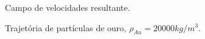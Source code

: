 \documentclass{beamer}
\begin{document}
\begin{frame}
  \frametitle{\subsecname}
  
  \begin{minipage}{.48\textwidth}
    \centering
    \begin{figure}
       {\raggedleft \tiny Campo de velocidades resultante.}
    \end{figure}
  \end{minipage}
  \hfill
  \begin{minipage}{.48\textwidth}
    \begin{figure}
       {\raggedleft \tiny Trajetória de partículas de ouro, $\rho_{Au}=20000kg/m^3$.}
    \end{figure}
  \end{minipage}
  

\end{frame}
\end{document}
